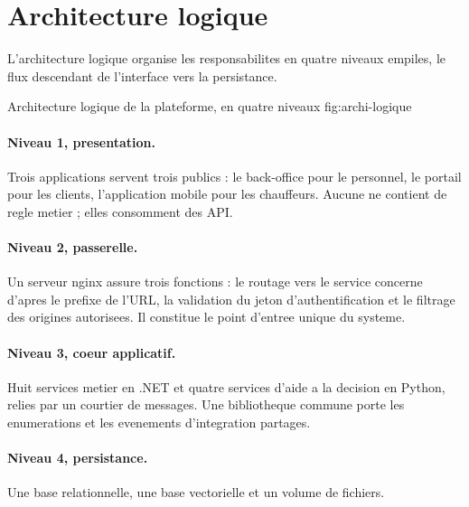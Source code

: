 \section{Architecture logique}
\label{sec:archi-logique}

L'architecture logique organise les responsabilites en quatre niveaux
empiles, le flux descendant de l'interface vers la persistance.

  {Architecture logique de la plateforme, en quatre niveaux}
  {fig:archi-logique}

\paragraph{Niveau 1, presentation.}
Trois applications servent trois publics : le back-office pour le
personnel, le portail pour les clients, l'application mobile pour les
chauffeurs. Aucune ne contient de regle metier ; elles consomment des API.

\paragraph{Niveau 2, passerelle.}
Un serveur nginx assure trois fonctions : le routage vers le service
concerne d'apres le prefixe de l'URL, la validation du jeton
d'authentification et le filtrage des origines autorisees. Il constitue
le point d'entree unique du systeme.

\paragraph{Niveau 3, coeur applicatif.}
Huit services metier en .NET et quatre services d'aide a la decision en
Python, relies par un courtier de messages. Une bibliotheque commune
porte les enumerations et les evenements d'integration partages.

\paragraph{Niveau 4, persistance.}
Une base relationnelle, une base vectorielle et un volume de fichiers.

